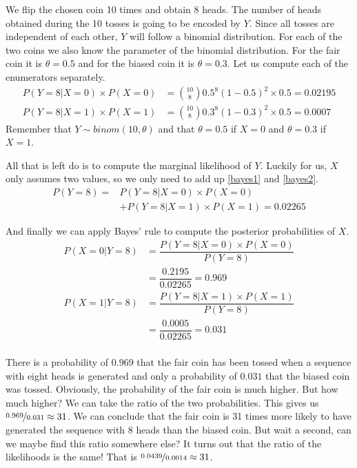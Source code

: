 We flip the chosen coin 10 times and obtain 8 heads. The number of heads obtained during the 10 tosses is going
to be encoded by $ Y $. Since all tosses are independent of each other, $ Y $ will
follow a binomial distribution. For each of the two coins we also know the parameter of the binomial distribution.
For the fair coin it is $ \theta = 0.5 $ and for the biased coin it is $ \theta = 0.3 $. Let us compute each of the
enumerators separately.
\begin{align}
P(Y=8|X=0) \times P(X=0) &= \binom{10}{8} 0.5^8 (1-0.5)^2 \times 0.5 = 0.02195 \label{bayes1}\\
P(Y=8|X=1) \times P(X=1) &= \binom{10}{8} 0.3^8 (1-0.3)^2 \times 0.5 = 0.0007 \label{bayes2}
\end{align}
Remember that $ Y \sim binom(10,\theta) $ and that $ \theta=0.5 $ if $ X=0 $ and $ \theta=0.3 $ if $ X=1 $. 

All that is left do is to compute the marginal likelihood of $ Y $. Luckily for us, $ X $ only assumes two
values, so we only need to add up \eqref{bayes1} and \eqref{bayes2}.
\begin{align}
P(Y=8) = &P(Y=8|X=0) \times P(X=0) \\
&+ P(Y=8|X=1) \times P(X=1) = 0.02265 \nonumber
\end{align}

And finally we can apply Bayes' rule to compute the posterior probabilities of $ X $.
\begin{align}
P(X=0|Y=8) &= \dfrac{P(Y=8|X=0) \times P(X=0)}{P(Y=8)} \\
&= \dfrac{0.2195}{0.02265} = 0.969 \nonumber \\
P(X=1|Y=8) &= \dfrac{P(Y=8|X=1) \times P(X=1)}{P(Y=8)} \\
&= \dfrac{0.0005}{0.02265} = 0.031 \nonumber \\
\end{align}

There is a probability of $ 0.969 $ that the fair coin has been tossed when a sequence with eight heads is
generated and only a probability of $ 0.031 $ that the biased coin was tossed. Obviously, the probability of the fair 
coin is much higher. But how much higher? We can take the ratio of the two probabilities. This gives us 
$ \nicefrac{0.969}{0.031} \approx 31 $. We can conclude that the fair coin is 31 times more likely to have generated the sequence with
8 heads than the biased coin. But wait a second, can we maybe find this ratio somewhere else? It turns out that 
the ratio of the likelihoods is the same! That is $ \nicefrac{0.0439}{0.0014} \approx 31 $.

